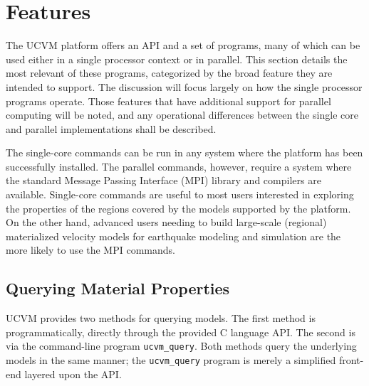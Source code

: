 
\section{Features}
\label{sec:features}

The UCVM platform offers an API and a set of programs, many of which can be used either in a single processor context or in parallel. This section details the most relevant of these programs, categorized by the broad feature they are intended to support. The discussion will focus largely on how the single processor programs operate. Those features that have additional support for parallel computing will be noted, and any operational differences between the single core and parallel implementations shall be described.

The single-core commands can be run in any system where the platform has been successfully installed. The parallel commands, however, require a system where the standard Message Passing Interface (MPI) library and compilers are available. Single-core commands are useful to most users interested in exploring the properties of the regions covered by the models supported by the platform. On the other hand, advanced users needing to build large-scale (regional) materialized velocity models for earthquake modeling and simulation are the more likely to use the MPI commands. 




\subsection{Querying Material Properties}
\label{sec:querying}

UCVM provides two methods for querying models. The first method is programmatically, directly through the provided C language API. The second is via the command-line program \texttt{ucvm\_query}. Both methods query the underlying models in the same manner; the \texttt{ucvm\_query} program is merely a simplified front-end layered upon the API.


